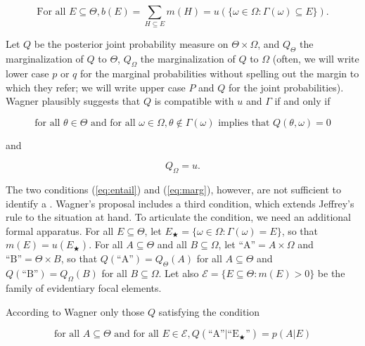 \documentclass[11pt]{article}
\begin{document}
\begin{equation}
  \mbox{For all }E\subseteq{}\Theta, b(E)=\sum_{H\subseteq{}E}m(H)=u(\{\omega\in\Omega:\Gamma(\omega)\subseteq{}E\})\label{eq:bof}.
\end{equation}

Let $Q$ be the posterior joint probability measure on
$\Theta\times\Omega$, and $Q_{\Theta}$ the marginalization of $Q$ to
$\Theta$, $Q_{\Omega}$ the marginalization of $Q$ to $\Omega$ (often,
we will write lower case $p$ or $q$ for the marginal probabilities
without spelling out the margin to which they refer; we will write
upper case $P$ and $Q$ for the joint probabilities). Wagner plausibly
suggests that $Q$ is compatible with $u$ and $\Gamma$ if and only if

\begin{equation}
  \label{eq:entail}
  \mbox{for all }\theta\in\Theta\mbox{ and for all
  }\omega\in\Omega,\theta\notin\Gamma(\omega)\mbox{ implies that }Q(\theta,\omega)=0
\end{equation}

and

\begin{equation}
  \label{eq:marg}
  Q_{\Omega}=u.
\end{equation}

The two conditions (\ref{eq:entail}) and (\ref{eq:marg}), however, are
not sufficient to identify a  . Wagner's proposal includes a third
condition, which extends Jeffrey's rule to the situation at hand. To
articulate the condition, we need an additional formal apparatus. For
all $E\subseteq{}\Theta$, let
$E_{\bigstar}=\{\omega\in\Omega:\Gamma(\omega)=E\}$, so that
$m(E)=u(E_{\bigstar})$. For all $A\subseteq\Theta$ and all
$B\subseteq\Omega$, let $\mbox{``A''}=A\times\Omega$ and
$\mbox{``B''}=\Theta\times{}B$, so that
$Q(\mbox{``A''})=Q_{\Theta}(A)$ for all $A\subseteq\Theta$ and
$Q(\mbox{``B''})=Q_{\Omega}(B)$ for all $B\subseteq\Omega$. Let also
$\mathcal{E}=\{E\subseteq\Theta:m(E)>0\}$ be the family of evidentiary
focal elements.

According to Wagner only those $Q$ satisfying the condition

\begin{equation}
  \label{eq:wagn}
  \mbox{for all }A\subseteq\Theta\mbox{ and for all }E\in\mathcal{E},Q(\mbox{``A''}|\mbox{``E$_{\bigstar}$''})=p(A|E)
\end{equation}
\end{document}

